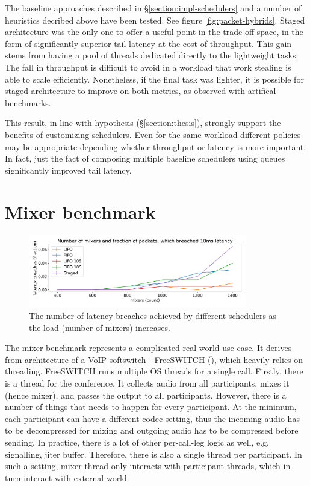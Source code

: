 \documentclass[12pt,a4paper,twoside]{report}
\begin{document}
The baseline approaches described in \S\ref{section:impl-schedulers} and a number of heuristics decribed above have been tested. See figure \ref{fig:packet-hybrids}. Staged architecture was the only one to offer a useful point in the trade-off space, in the form of significantly superior tail latency at the cost of throughput. This gain stems from having a pool of threads dedicated directly to the lightweight tasks. The fall in throughput is difficult to avoid in a workload that work stealing is able to scale efficiently. Nonetheless, if the final task was lighter, it is possible for staged architecture to improve on both metrics, as observed with artifical benchmarks. 

This result, in line with hypothesis (\S\ref{section:thesis}), strongly support the benefits of customizing schedulers. Even for the same workload different policies may be appropriate depending whether throughput or latency is more important. In fact, just the fact of composing multiple baseline schedulers using queues significantly improved tail latency.

\section{Mixer benchmark}
\label{section:mixer-benchmark}

\begin{figure} 
    \centering 
    \includegraphics[width=0.85\textwidth]{eval/mixer-base8.png}
    \caption{The number of latency breaches achieved by different schedulers as the load (number of mixers) increases.}
   \label{fig:mixer-bench}
\end{figure}

The mixer benchmark represents a complicated real-world use case. It derives from architecture of a VoIP softswitch - FreeSWITCH (\cite{Maruzzelli2017-ou}), which heavily relies on threading. FreeSWITCH runs multiple OS threads for a single call. Firstly, there is a thread for the conference. It collects audio from all participants, mixes it (hence mixer), and passes the output to all participants. However, there is a number of things that needs to happen for every participant. At the minimum, each participant can have a different codec setting, thus the incoming audio has to be decompressed for mixing and outgoing audio has to be compressed before sending. In practice, there is a lot of other per-call-leg logic as well, e.g. signalling, jiter buffer. Therefore, there is also a single thread per participant. In such a setting, mixer thread only interacts with participant threads, which in turn interact with external world. 
\end{document}
